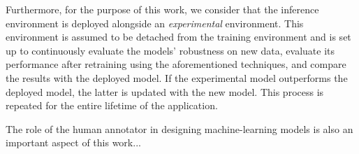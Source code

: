\documentclass[../main.tex]{subfiles}
\begin{document}
    Furthermore, for the purpose of this work, we consider that the inference environment is deployed alongside an \textit{experimental} environment. This environment is assumed to be detached from the training environment and is set up to continuously evaluate the models' robustness on new data, evaluate its performance after retraining using the aforementioned techniques, and compare the results with the deployed model. If the experimental model outperforms the deployed model, the latter is updated with the new model. This process is repeated for the entire lifetime of the application.


    The role of the human annotator in designing machine-learning models is also an important aspect of this work...

        
  
\end{document}
